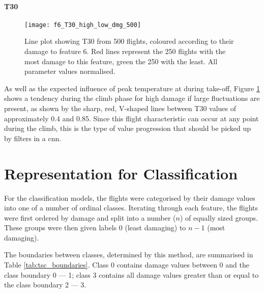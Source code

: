

\paragraph*{T30}
\begin{figure}
    \centering
    \texttt{[image: f6\_T30\_high\_low\_dmg\_500]}
    \caption{\label{fig:high_low_dmg_T30} Line plot showing T30 from 500 flights, coloured according to their damage to feature 6. Red lines represent the 250 flights with the most damage to this feature, green the 250 with the least. All parameter values normalised.}
\end{figure}

As well as the expected influence of peak temperature at during take-off, Figure \ref{fig:high_low_dmg_T30} shows a tendency during the climb phase for high damage if large fluctuations are present, as shown by the sharp, red, V-shaped lines between T30 values of approximately 0.4 and 0.85. Since this flight characteristic can occur at any point during the climb, this is the type of value progression that should be picked up by filters in a \ac{cnn}.

\section{Representation for Classification} \label{sec:data:classification_rep}
For the classification models, the flights were categorised by their damage values into one of a number of ordinal classes. Iterating through each feature, the flights were first ordered by damage and split into a number (\(n\)) of equally sized groups. These groups were then given labels \(0\) (least damaging) to \(n-1\) (most damaging).

The boundaries between classes, determined by this method, are summarised in Table \ref{tab:tsc_boundaries}. Class 0 contains damage values between 0 and the class boundary 0 --- 1; class 3 contains all damage values greater than or equal to the class boundary 2 --- 3.

